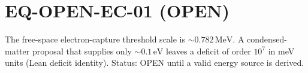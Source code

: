 \documentclass{article}
\begin{document}
\section*{EQ-OPEN-EC-01 (OPEN)}
The free-space electron-capture threshold scale is $\sim 0.782\,\mathrm{MeV}$.
A condensed-matter proposal that supplies only $\sim 0.1\,\mathrm{eV}$ leaves a
deficit of order $10^{7}$ in meV units (Lean deficit identity). Status: OPEN
until a valid energy source is derived.
\end{document}
